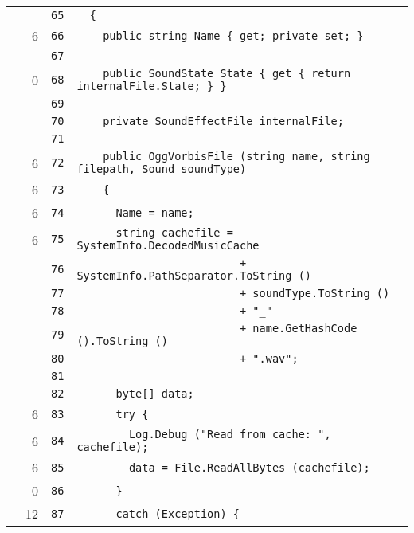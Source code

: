 \documentclass[a4paper,10pt]{article}
\begin{document}
\begin{longtable}[l]{lrrl}
\cellcolor{gray} &  & \verb~65~ & \verb~  {~\\
\cellcolor{green} & 6 & \verb~66~ & \verb~    public string Name { get; private set; }~\\
\cellcolor{gray} &  & \verb~67~ & \verb~~\\
\cellcolor{red} & 0 & \verb~68~ & \verb~    public SoundState State { get { return internalFile.State; } }~\\
\cellcolor{gray} &  & \verb~69~ & \verb~~\\
\cellcolor{gray} &  & \verb~70~ & \verb~    private SoundEffectFile internalFile;~\\
\cellcolor{gray} &  & \verb~71~ & \verb~~\\
\cellcolor{green} & 6 & \verb~72~ & \verb~    public OggVorbisFile (string name, string filepath, Sound soundType)~\\
\cellcolor{green} & 6 & \verb~73~ & \verb~    {~\\
\cellcolor{green} & 6 & \verb~74~ & \verb~      Name = name;~\\
\cellcolor{green} & 6 & \verb~75~ & \verb~      string cachefile = SystemInfo.DecodedMusicCache~\\
\cellcolor{gray} &  & \verb~76~ & \verb~                         + SystemInfo.PathSeparator.ToString ()~\\
\cellcolor{gray} &  & \verb~77~ & \verb~                         + soundType.ToString ()~\\
\cellcolor{gray} &  & \verb~78~ & \verb~                         + "_"~\\
\cellcolor{gray} &  & \verb~79~ & \verb~                         + name.GetHashCode ().ToString ()~\\
\cellcolor{gray} &  & \verb~80~ & \verb~                         + ".wav";~\\
\cellcolor{gray} &  & \verb~81~ & \verb~~\\
\cellcolor{gray} &  & \verb~82~ & \verb~      byte[] data;~\\
\cellcolor{green} & 6 & \verb~83~ & \verb~      try {~\\
\cellcolor{green} & 6 & \verb~84~ & \verb~        Log.Debug ("Read from cache: ", cachefile);~\\
\cellcolor{green} & 6 & \verb~85~ & \verb~        data = File.ReadAllBytes (cachefile);~\\
\cellcolor{red} & 0 & \verb~86~ & \verb~      }~\\
\cellcolor{green} & 12 & \verb~87~ & \verb~      catch (Exception) {~\\

\end{longtable}
\end{document}
